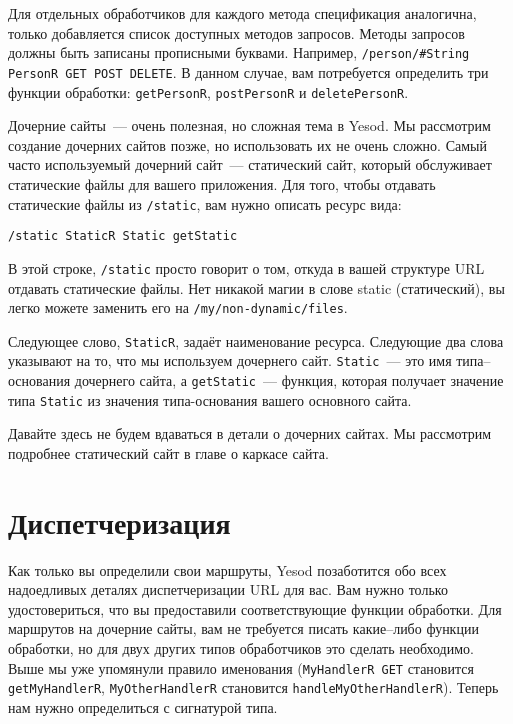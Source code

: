 Для отдельных обработчиков для каждого метода спецификация аналогична,
только добавляется список доступных методов запросов. Методы запросов
должны быть записаны прописными буквами. Например,
\lstinline!/person/#String PersonR GET POST DELETE!.
В данном случае, вам потребуется определить три функции обработки:
\lstinline!getPersonR!, \lstinline!postPersonR! и \lstinline!deletePersonR!.

Дочерние сайты~--- очень полезная, но сложная тема в Yesod. Мы рассмотрим
создание дочерних сайтов позже, 
но использовать их не очень сложно. Самый
часто используемый дочерний сайт~--- статический сайт, который
обслуживает статические файлы для вашего приложения. Для того, чтобы
отдавать статические файлы из \lstinline!/static!, вам нужно описать
ресурс вида:
\begin{verbatim}
/static StaticR Static getStatic
\end{verbatim}

В этой строке, \lstinline!/static! просто говорит о том, откуда в вашей
структуре URL отдавать статические файлы. Нет никакой магии в слове
static (статический), вы легко можете заменить его на
\lstinline!/my/non-dynamic/files!.

Следующее слово, \lstinline!StaticR!, задаёт наименование
ресурса. Следующие два слова указывают на то, что мы используем
дочернего сайт. \lstinline!Static!~--- это имя типа--основания дочернего сайта, а
\lstinline!getStatic!~--- функция, которая получает значение типа
\lstinline!Static! из значения типа-основания вашего основного сайта.

Давайте здесь не будем вдаваться в детали о дочерних сайтах. Мы рассмотрим
подробнее статический сайт в главе о каркасе
сайта.

\section{Диспетчеризация}
Как только вы определили свои маршруты, Yesod позаботится обо всех
надоедливых деталях диспетчеризации URL для вас. Вам нужно только
удостовериться, что вы предоставили соответствующие функции
обработки. Для маршрутов на дочерние сайты, вам не требуется писать
какие--либо функции обработки, но для двух других типов обработчиков
это сделать необходимо. Выше мы уже упомянули правило именования
(\lstinline!MyHandlerR GET! становится \lstinline!getMyHandlerR!,
\lstinline!MyOtherHandlerR! становится \lstinline!handleMyOtherHandlerR!).
Теперь нам нужно определиться с сигнатурой типа.

